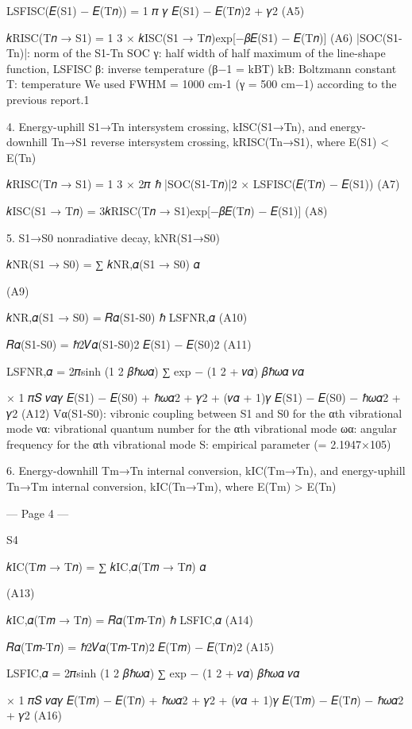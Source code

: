 LSFISC(𝐸(S1) − 𝐸(T𝑛)) = 1
𝜋
𝛾
{𝐸(S1) − 𝐸(T𝑛)}2 + 𝛾2 
(A5) 
 
𝑘RISC(T𝑛 → S1) = 1
3 × 𝑘ISC(S1 → T𝑛)exp[−𝛽{𝐸(S1) − 𝐸(T𝑛)}] 
(A6) 
|SOC(S1-Tn)|: norm of the S1-Tn SOC 
γ: half width of half maximum of the line-shape function, LSFISC  
β: inverse temperature (β−1 = kBT) 
kB: Boltzmann constant 
T: temperature 
We used FWHM = 1000 cm-1 (γ = 500 cm−1) according to the previous report.1 
 
4. Energy-uphill S1→Tn intersystem crossing, kISC(S1→Tn), and energy-downhill Tn→S1 
reverse intersystem crossing, kRISC(Tn→S1), where E(S1) < E(Tn) 
 
𝑘RISC(T𝑛 → S1) = 1
3 × 2𝜋
ℏ |SOC(S1-T𝑛)|2 × LSFISC(𝐸(T𝑛) − 𝐸(S1)) 
(A7) 
 
𝑘ISC(S1 → T𝑛) = 3𝑘RISC(T𝑛 → S1)exp[−𝛽{𝐸(T𝑛) − 𝐸(S1)}] 
(A8) 
 
5. S1→S0 nonradiative decay, kNR(S1→S0) 
 
𝑘NR(S1 → S0) = ∑ 𝑘NR,𝛼(S1 → S0)
𝛼
 
(A9) 
 
𝑘NR,𝛼(S1 → S0) = 𝑅𝛼(S1-S0)
ℏ
LSFNR,𝛼 
(A10) 
 
𝑅𝛼(S1-S0) =
ℏ2𝑉𝛼(S1-S0)2
{𝐸(S1) − 𝐸(S0)}2 
(A11) 
 
LSFNR,𝛼 = 2𝜋sinh (1
2 𝛽ℏ𝜔𝛼) ∑ exp {− (1
2 + 𝑣𝛼) 𝛽ℏ𝜔𝛼}
𝑣𝛼
 
 
 
× 1
𝜋𝑆 {
𝑣𝛼𝛾
{𝐸(S1) − 𝐸(S0) + ℏ𝜔𝛼}2 + 𝛾2 +
(𝑣𝛼 + 1)𝛾
{𝐸(S1) − 𝐸(S0) − ℏ𝜔𝛼}2 + 𝛾2} 
(A12) 
Vα(S1-S0): vibronic coupling between S1 and S0 for the αth vibrational mode 
να: vibrational quantum number for the αth vibrational mode 
ωα: angular frequency for the αth vibrational mode 
S: empirical parameter (= 2.1947×105) 
 
6. Energy-downhill Tm→Tn internal conversion, kIC(Tm→Tn), and energy-uphill Tn→Tm 
internal conversion, kIC(Tn→Tm), where E(Tm) > E(Tn) 


--- Page 4 ---
 
S4 
 
𝑘IC(T𝑚 → T𝑛) = ∑ 𝑘IC,𝛼(T𝑚 → T𝑛)
𝛼
 
(A13) 
 
𝑘IC,𝛼(T𝑚 → T𝑛) = 𝑅𝛼(T𝑚-T𝑛)
ℏ
LSFIC,𝛼 
(A14) 
 
𝑅𝛼(T𝑚-T𝑛) =
ℏ2𝑉𝛼(T𝑚-T𝑛)2
{𝐸(T𝑚) − 𝐸(T𝑛)}2 
(A15) 
 
LSFIC,𝛼 = 2𝜋sinh (1
2 𝛽ℏ𝜔𝛼) ∑ exp {− (1
2 + 𝑣𝛼) 𝛽ℏ𝜔𝛼}
𝑣𝛼
 
 
 
× 1
𝜋𝑆 {
𝑣𝛼𝛾
{𝐸(T𝑚) − 𝐸(T𝑛) + ℏ𝜔𝛼}2 + 𝛾2 +
(𝑣𝛼 + 1)𝛾
{𝐸(T𝑚) − 𝐸(T𝑛) − ℏ𝜔𝛼}2 + 𝛾2} 
(A16) 
 
